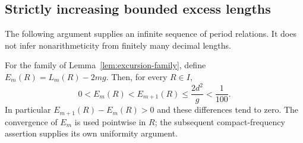 \subsection{Strictly increasing bounded excess lengths}
The following argument supplies an infinite sequence of period relations.
It does not infer nonarithmeticity from finitely many decimal lengths.

\begin{theorem}\label{thm:period-excess}
For the family of Lemma~\ref{lem:excursion-family}, define
$E_m(R)=L_m(R)-2m g$. Then, for every $R\in I$,
\begin{equation}\label{eq:period-excess}
 0<E_m(R)<E_{m+1}(R)\le \frac{2d^2}{g}<\frac1{100}.
\end{equation}
In particular $E_{m+1}(R)-E_m(R)>0$ and these differences tend to
zero. The convergence of $E_m$ is used pointwise in $R$; the subsequent
compact-frequency assertion supplies its own uniformity argument.
\end{theorem}
